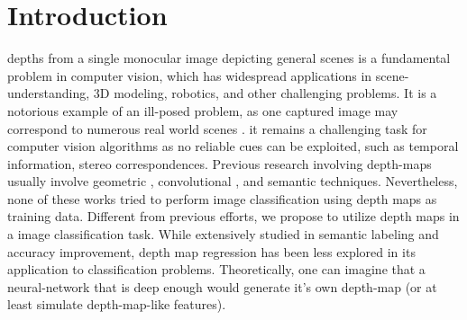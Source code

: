 \documentclass[journal]{IEEEtran}
\begin{document}
	
	
	
	
	
	\IEEEpeerreviewmaketitle
	
	
	
	\section{Introduction}
	 depths from a single monocular image depicting 
	general scenes is a fundamental problem in computer vision, 
	which has widespread applications in scene-understanding, 
	3D modeling, robotics, and other challenging problems.
	It is a notorious example of an ill-posed problem, 
	as one captured image may correspond to numerous real world scenes \cite{eigen2014depth}. 
	it remains a challenging task for computer vision algorithms as no reliable cues can be exploited,
	such as temporal information, stereo correspondences.
	Previous research involving depth-maps usually involve
	geometric \cite{hedau2010thinking,gupta2010estimating,gupta2010blocks}, convolutional \cite{liu2015deep}, and semantic \cite{ladicky2014pulling} techniques.
	Nevertheless, none of these works tried to perform image classification using depth maps as training data.
	Different from previous efforts, 
	we propose to utilize depth maps in a image classification task.
	While extensively studied in semantic labeling and accuracy improvement,
	depth map regression has been less explored in its application to classification problems. Theoretically, one can imagine that a neural-network that is deep enough would generate it's own depth-map (or at least simulate depth-map-like features).
	
\end{document}
